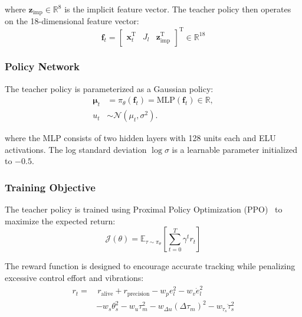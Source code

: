 \documentclass[lettersize,journal]{IEEEtran}
\begin{document}
\noindent where $\bm{z}_{\text{imp}} \in \mathbb{R}^8$ is the implicit feature vector. The teacher policy then operates on the 18-dimensional feature vector:
\begin{equation}
\bm{f}_t = \begin{bmatrix}
\bm{x}_t^\mathrm{T} & J_l & \bm{z}_{\text{imp}}^\mathrm{T}
\end{bmatrix}^\mathrm{T} \in \mathbb{R}^{18} \label{eq:teacher_features}
\end{equation}

\subsubsection{Policy Network}

The teacher policy is parameterized as a Gaussian policy:
\begin{equation}
\begin{aligned}
\bm{\mu}_t &= \pi_\theta(\bm{f}_t) = \text{MLP}(\bm{f}_t) \in \mathbb{R}, \\
u_t &\sim \mathcal{N}(\mu_t, \sigma^2).
\end{aligned}
\label{eq:teacher_policy}
\end{equation}

\noindent where the MLP consists of two hidden layers with 128 units each and ELU activations. The log standard deviation $\log \sigma$ is a learnable parameter initialized to $-0.5$.

\subsubsection{Training Objective}

The teacher policy is trained using Proximal Policy Optimization (PPO)~\cite{schulman2017Proximal} to maximize the expected return:
\begin{equation}
\mathcal{J}(\theta) = \mathbb{E}_{\tau \sim \pi_\theta} \left[ \sum_{t=0}^T \gamma^t r_t \right] \label{eq:ppo_objective}
\end{equation}

The reward function is designed to encourage accurate tracking while penalizing excessive control effort and vibrations:
\begin{align}
r_t = &\, r_{\text{alive}} + r_{\text{precision}} - w_p e_{l}^2 - w_v \dot{e}_{l}^2 \nonumber \\
&- w_s \theta_s^2 - w_u \tau_m^2 - w_{\Delta u} (\Delta \tau_m)^2 - w_{\ddot{\tau}_s} \ddot{\tau}_s^2 \label{eq:reward}
\end{align}
\end{document}
